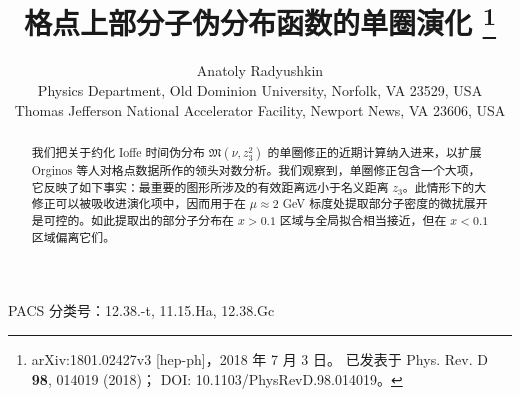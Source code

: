 \documentclass[11pt]{ctexart}
\begin{document}
\title{格点上部分子伪分布函数的单圈演化%
\thanks{arXiv:1801.02427v3 [hep-ph]，2018 年 7 月 3 日。
已发表于 Phys. Rev. D \textbf{98}, 014019 (2018)；
DOI: 10.1103/PhysRevD.98.014019。}}

\author{Anatoly Radyushkin\\[6pt]
\normalsize Physics Department, Old Dominion University, Norfolk, VA 23529, USA\\
\normalsize Thomas Jefferson National Accelerator Facility, Newport News, VA 23606, USA}

\date{}

\maketitle

\begin{abstract}
\noindent
我们把关于约化 Ioffe 时间伪分布 ${\mathfrak M} (\nu,z_3^2)$ 的单圈修正的近期计算纳入进来，以扩展 Orginos 等人对格点数据所作的领头对数分析。我们观察到，单圈修正包含一个大项，它反映了如下事实：最重要的图形所涉及的有效距离远小于名义距离 $z_3$。此情形下的大修正可以被吸收进演化项中，因而用于在 $\mu \approx 2$ GeV 标度处提取部分子密度的微扰展开是可控的。如此提取出的部分子分布在 $x>0.1$ 区域与全局拟合相当接近，但在 $x<0.1$ 区域偏离它们。

\end{abstract}

\noindent
PACS 分类号：12.38.-t, 11.15.Ha, 12.38.Gc

\bigskip







\end{document}
